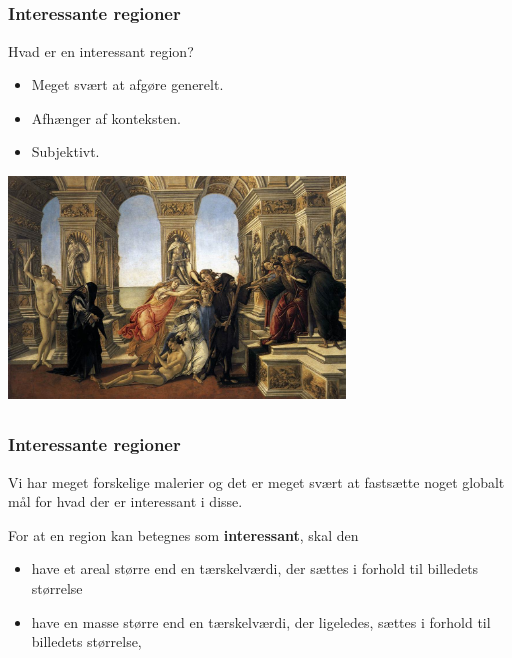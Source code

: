 \documentclass{beamer}
\begin{document}
\subsection*{}
\begin{frame}

    \frametitle{Interessante regioner}

    \begin{block}{Hvad er en interessant region?}
        \begin{itemize}
            \item Meget svært at afgøre generelt.
            \item Afhænger af konteksten.
            \item Subjektivt.
        \end{itemize}
    \end{block}

    \begin{center}
        \includegraphics[width=0.67\textwidth]{billeder/10calumn.jpg}
    \end{center}

\end{frame}

\subsection*{}
\begin{frame}

    \frametitle{Interessante regioner}

    Vi har meget forskelige malerier og det er meget svært at fastsætte noget globalt mål for
    hvad der er interessant i disse.

    \begin{definition}
        For at en region kan betegnes som \textbf{interessant}, skal den
        \begin{itemize}
            \item have et areal større end en tærskelværdi, der sættes i
                forhold til billedets størrelse
            \item have en masse større end en tærskelværdi, der ligeledes,
                sættes i forhold til billedets størrelse,
        \end{itemize}
    \end{definition}

\end{frame}
\end{document}
